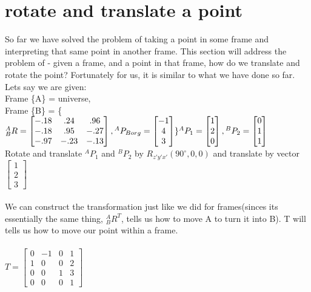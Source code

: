 \documentclass{article}
\begin{document}
\section{rotate and translate a point}
So far we have solved the problem of taking a point in some frame and interpreting that same point in another frame. This section will address the problem of - given a frame, and a point in that frame, how do we translate and rotate the point? Fortunately for us, it is similar to what we have done so far. \\
Lets say we are given:\\
Frame \{A\} = universe,\\ 
Frame \{B\} = \{${}^{A}_{B}R=\begin{bmatrix}
-.18 & .24 & .96\\
-.18 & .95 & -.27\\
-.97 & -.23 & -.13
\end{bmatrix} ,{}^{A}P_{Borg}=\begin{bmatrix}
-1  \\
4  \\
3
\end{bmatrix}\}\\
{}^{A}P_{1}=\begin{bmatrix}
1  \\
2  \\
0
\end{bmatrix}, {}^{B}P_{2}=\begin{bmatrix}
0  \\
1  \\
1
\end{bmatrix}$\\
Rotate and translate ${}^{A}P_{1}$ and ${}^{B}P_{2}$ by $R_{z'y'x'}(90^{\circ},0,0)$ and translate by vector $\begin{bmatrix}
1  \\
2  \\
3
\end{bmatrix}$\\\\
We can construct the transformation just like we did for frames(sinces its essentially the same thing, ${}^{A}_{B}R^T$, tells us how to move A to turn it into B). T will tells us how to move our point within a frame.\\\\
$T = \begin{bmatrix}
0 & -1 & 0 & 1\\
1 & 0 & 0 & 2\\
0 & 0 & 1 &  3\\
0 & 0 & 0 & 1
\end{bmatrix}$\\\\
\end{document}
